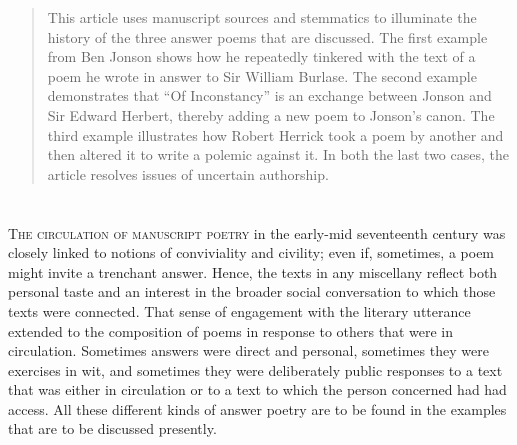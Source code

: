 
\begin{paper}

\begin{abstract}
This article uses manuscript sources and stemmatics to illuminate the history of the three answer poems that are discussed. The first example from Ben Jonson shows how he repeatedly tinkered with the text of a poem he wrote in answer to Sir William Burlase. The second example demonstrates that ``Of Inconstancy'' is an exchange between Jonson and Sir Edward Herbert, thereby adding a new poem to Jonson’s canon. The third example illustrates how Robert Herrick took a poem by another and then altered it to write a polemic against it. In both the last two cases, the article resolves issues of uncertain authorship.
\end{abstract}

\section*{} 
\textsc{The circulation of manuscript poetry} in the early-mid
seventeenth century was closely linked to notions of conviviality and
civility; even if, sometimes, a poem might invite a trenchant answer. Hence, the texts in any miscellany reflect both personal taste and an
interest in the broader social conversation to which those texts were
connected. That sense of engagement with the literary utterance extended
to the composition of poems in response to others that were in
circulation. Sometimes answers were direct and personal, sometimes they
were exercises in wit, and sometimes they were deliberately public
responses to a text that was either in circulation or to a text to which
the person concerned had had access. All these different kinds of answer
poetry are to be found in the examples that are to be discussed
presently.


\end{paper}
